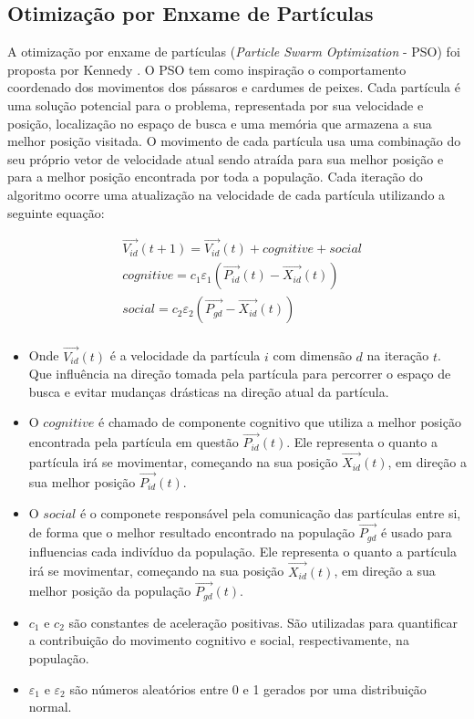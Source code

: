 \subsection{Otimização por Enxame de Partículas}
\label{sec:particle_swarm_optimization}
A otimização por enxame de partículas (\textit{Particle Swarm Optimization} - PSO) foi proposta por Kennedy \cite{pso}. O PSO tem como inspiração o comportamento coordenado dos movimentos dos pássaros e cardumes de peixes. Cada partícula é uma solução potencial para o problema, representada por sua velocidade e posição, localização no espaço de busca e uma memória que armazena a sua melhor posição visitada. O movimento de cada partícula usa uma combinação do seu próprio vetor de velocidade atual sendo atraída para sua melhor posição e para a melhor posição encontrada por toda a população. Cada iteração do algoritmo ocorre uma atualização na velocidade de cada partícula utilizando a seguinte equação:

\begin{equation}
\label{eq:pso_update_volocity}
\begin{split}
& \vec{V_{id}}(t + 1) = \vec{V_{id}}(t) + cognitive + social \\
& cognitive = c_1 \varepsilon_1 (\vec{P_{id}}(t) - \vec{X_{id}}(t)) \\
& social = c_2 \varepsilon_2 (\vec{P_{gd}} - \vec{X_{id}}(t)) \\
\end{split}
\end{equation}

\begin{itemize}
\item Onde $\vec{V_{id}}(t)$ é a velocidade da partícula $i$ com dimensão $d$ na iteração $t$. Que influência na direção tomada pela partícula para percorrer o espaço de busca e evitar mudanças drásticas na direção atual da partícula.

\item O $cognitive$ é chamado de componente cognitivo que utiliza a melhor posição encontrada pela partícula em questão $\vec{P_{id}}(t)$. Ele representa o quanto a partícula irá se movimentar, começando na sua posição $\vec{X_{id}}(t)$, em direção a sua melhor posição $\vec{P_{id}}(t)$.

\item O $social$ é o componete responsável pela comunicação das partículas entre si, de forma que o melhor resultado encontrado na população $\vec{P_{gd}}$ é usado para influencias cada indivíduo da população. Ele representa o quanto a partícula irá se movimentar, começando na sua posição $\vec{X_{id}}(t)$, em direção a sua melhor posição da população $\vec{P_{gd}}(t)$.

\item $c_1$ e $c_2$ são constantes de aceleração positivas. São utilizadas para quantificar a contribuição do movimento cognitivo e social, respectivamente, na população.

\item $\varepsilon_1$ e $\varepsilon_2$ são números aleatórios entre 0 e 1 gerados por uma distribuição normal.
\end{itemize}

